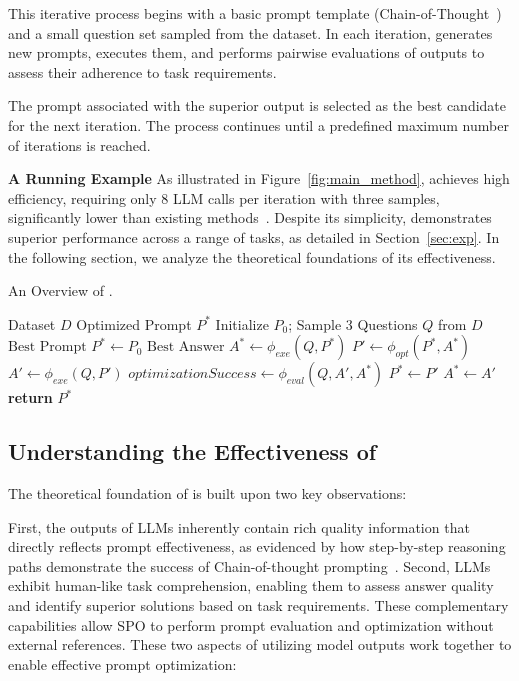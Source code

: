 This iterative process begins with a basic prompt template (\eg Chain-of-Thought~\cite{wei2022COT}) and a small question set
sampled from the dataset. In each iteration, \ours generates new prompts, executes them, and performs pairwise evaluations of outputs to assess their adherence to task requirements.

The prompt associated with the superior output is selected as the best candidate for the next iteration. The process continues until a predefined maximum number of iterations is reached.

\textbf{A Running Example}
As illustrated in Figure~\ref{fig:main_method}, \ours achieves high efficiency, requiring only 8 LLM calls per iteration with three samples, significantly lower than existing methods~\cite{xin2024pa, chris2024pb, mert2024textgrad, 10720675, yong2023ape}. Despite its simplicity, \ours demonstrates superior performance across a range of tasks, as detailed in Section~\ref{sec:exp}. In the following section, we analyze the theoretical foundations of its effectiveness.


\begin{algorithm}[t!]
\small
\caption{An Overview of \ours.}
\label{alg:concise-algo-pipo}
\begin{algorithmic}[1]
\REQUIRE Dataset $D$
\ENSURE Optimized Prompt $P^*$
\STATE Initialize $P_0$; Sample 3 Questions $Q$ from $D$
\STATE $\text{Best Prompt } P^* \gets P_0$
\STATE $\text{Best Answer } A^* \gets \phi_{exe}(Q, P^*)$
    \STATE $P' \gets \phi_{opt}(P^*, A^*)$
    \STATE $A' \gets \phi_{exe}(Q, P')$
    \STATE $optimizationSuccess \gets \phi_{eval}(Q, A', A^*)$
        \STATE $P^* \gets P'$
        \STATE $A^* \gets A'$
    \ENDIF
\ENDFOR
\STATE \textbf{return} $P^*$
\end{algorithmic}
\end{algorithm}


\subsection{Understanding the Effectiveness of \ours}
\label{sec:method_essence}


The theoretical foundation of \ours is built upon two key observations:

First, the outputs of LLMs inherently contain rich quality information that directly reflects prompt effectiveness, as evidenced by how step-by-step reasoning paths demonstrate the success of Chain-of-thought prompting~\cite{wei2022COT}. Second, LLMs exhibit human-like task comprehension, enabling them to assess answer quality and identify superior solutions based on task requirements. These complementary capabilities allow SPO to perform prompt evaluation and optimization without external references. These two aspects of utilizing model outputs work together to enable effective prompt optimization:

